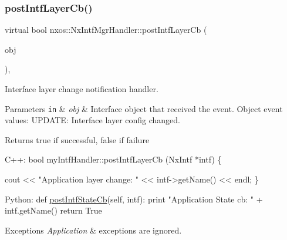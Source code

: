\subsubsection{\texorpdfstring{post\+Intf\+Layer\+Cb()}{postIntfLayerCb()}}
{\footnotesize\ttfamily virtual bool nxos\+::\+Nx\+Intf\+Mgr\+Handler\+::post\+Intf\+Layer\+Cb (\begin{DoxyParamCaption}\item[{\mbox{\hyperlink{classnxos_1_1_nx_intf}{Nx\+Intf}} $\ast$}]{obj }\end{DoxyParamCaption})\hspace{0.3cm}{\ttfamily [inline]}, {\ttfamily [virtual]}}

Interface layer change notification handler. 
\begin{DoxyParams}[1]{Parameters}
\mbox{\tt in}  & {\em obj} & Interface object that received the event. Object event values\+: U\+P\+D\+A\+TE\+: Interface layer config changed. \\
\hline
\end{DoxyParams}
\begin{DoxyReturn}{Returns}
true if successful, false if failure
\end{DoxyReturn}

\begin{DoxyCode}
C++:
   \textcolor{keywordtype}{bool} 
   myIntfHandler::postIntfLayerCb  (NxIntf *intf)
   \{

       cout << \textcolor{stringliteral}{"Application layer change: "} << 
                  intf->getName() << endl;
   \}

Python:    
   def \mbox{\hyperlink{classnxos_1_1_nx_intf_mgr_handler_a9c3d4d357b1f0ab07558b4611c693755}{postIntfStateCb}}(\textcolor{keyword}{self}, intf):
       print \textcolor{stringliteral}{"Application State cb: "} + intf.getName()
       return True
\end{DoxyCode}



\begin{DoxyExceptions}{Exceptions}
{\em Application} & exceptions are ignored. \\
\hline
\end{DoxyExceptions}
\mbox{\label{classnxos_1_1_nx_intf_mgr_handler_ae3a76ba4fb97b941d9f11e9210d89a94}} 
